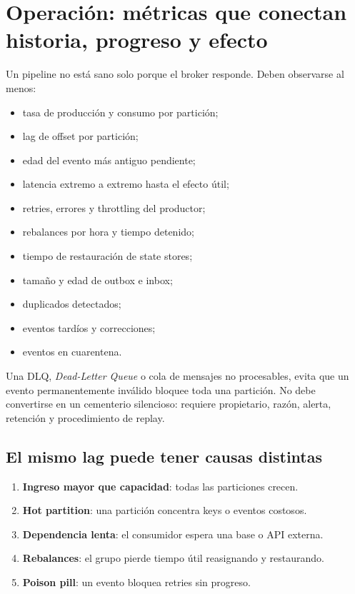 \documentclass[variant=apuntes,cover=institutional,mode=screen]{ua-engineering-v6-article}
\begin{document}
\section{Operación: métricas que conectan historia, progreso y efecto}

Un pipeline no está sano solo porque el broker responde. Deben observarse al menos:

\begin{itemize}
\item tasa de producción y consumo por partición;
\item lag de offset por partición;
\item edad del evento más antiguo pendiente;
\item latencia extremo a extremo hasta el efecto útil;
\item retries, errores y throttling del productor;
\item rebalances por hora y tiempo detenido;
\item tiempo de restauración de state stores;
\item tamaño y edad de outbox e inbox;
\item duplicados detectados;
\item eventos tardíos y correcciones;
\item eventos en cuarentena.
\end{itemize}

Una DLQ, \emph{Dead-Letter Queue} o cola de mensajes no procesables, evita que un evento permanentemente inválido bloquee toda una partición. No debe convertirse en un cementerio silencioso: requiere propietario, razón, alerta, retención y procedimiento de replay.

\subsection{El mismo lag puede tener causas distintas}

\begin{enumerate}
\item \textbf{Ingreso mayor que capacidad}: todas las particiones crecen.
\item \textbf{Hot partition}: una partición concentra keys o eventos costosos.
\item \textbf{Dependencia lenta}: el consumidor espera una base o API externa.
\item \textbf{Rebalances}: el grupo pierde tiempo útil reasignando y restaurando.
\item \textbf{Poison pill}: un evento bloquea retries sin progreso.
\end{enumerate}
\end{document}
